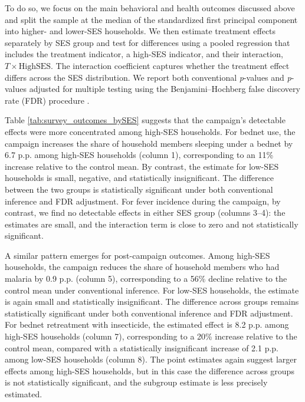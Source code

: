 To do so, we focus on the main behavioral and health outcomes discussed above and split the sample at the median of the standardized first principal component into higher- and lower-SES households. We then estimate treatment effects separately by SES group and test for differences using a pooled regression that includes the treatment indicator, a high-SES indicator, and their interaction, $T \times \text{HighSES}$. The interaction coefficient captures whether the treatment effect differs across the SES distribution. We report both conventional \textit{p}-values and \textit{p}-values adjusted for multiple testing using the Benjamini--Hochberg false discovery rate (FDR) procedure \citep{benjamini1995controlling}.

\begin{table}[t]
    \centering
    \caption{Treatment effect heterogeneity by Household Socio-Economic Status (SES)} 
     \footnotesize
    
    \label{tab:survey_outcomes_bySES}
\end{table}

Table \ref{tab:survey_outcomes_bySES} suggests that the campaign’s detectable effects were more concentrated among high-SES households. For bednet use, the campaign increases the share of household members sleeping under a bednet by 6.7 p.p. among high-SES households (column 1), corresponding to an 11\% increase relative to the control mean. By contrast, the estimate for low-SES households is small, negative, and statistically insignificant. The difference between the two groups is statistically significant under both conventional inference and FDR adjustment. For fever incidence during the campaign, by contrast, we find no detectable effects in either SES group (columns 3--4): the estimates are small, and the interaction term is close to zero and not statistically significant. 

A similar pattern emerges for post-campaign outcomes. Among high-SES households, the campaign reduces the share of household members who had malaria by 0.9 p.p. (column 5), corresponding to a 56\% decline relative to the control mean under conventional inference. For low-SES households, the estimate is again small and statistically insignificant. The difference across groups remains statistically significant under both conventional inference and FDR adjustment. For bednet retreatment with insecticide, the estimated effect is 8.2 p.p. among high-SES households (column 7), corresponding to a 20\% increase relative to the control mean, compared with a statistically insignificant increase of 2.1 p.p. among low-SES households (column 8). The point estimates again suggest larger effects among high-SES households, but in this case the difference across groups is not statistically significant, and the subgroup estimate is less precisely estimated. 


